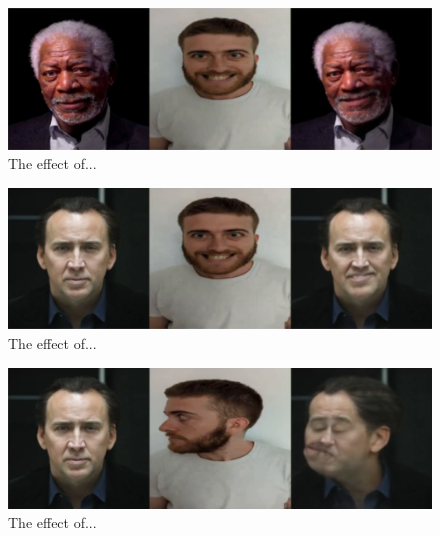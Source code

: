 \documentclass[english,12pt]{article}
\begin{document}
\begin{figure}[htb]
  \begin{centering}
      \includegraphics[scale=0.29]{images/Oren_smile_freeman.PNG}
  \par\end{centering}
  \caption{\label{fig:Oren_smile_freeman}The effect of...}
\end{figure}

\begin{figure}[htb]
  \begin{centering}
      \includegraphics[scale=0.29]{images/‏‏Oren_smile_cage.PNG}
  \par\end{centering}
  \caption{\label{fig:Oren_smile_cage}The effect of...}
\end{figure}

\begin{figure}[htb]
  \begin{centering}
      \includegraphics[scale=0.29]{images/Oren_tilt_cage.PNG}
  \par\end{centering}
  \caption{\label{fig:Oren_tilt_cage}The effect of...}
\end{figure}
\end{document}
